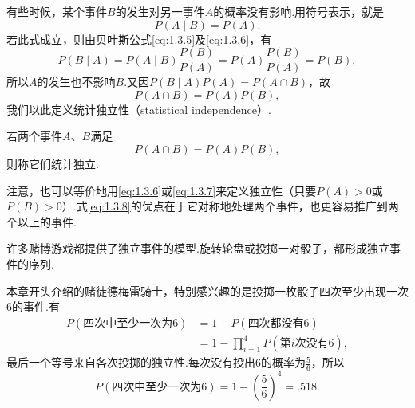 有些时候，某个事件$B$的发生对另一事件$A$的概率没有影响.用符号表示，就是
\begin{equation}\label{eq:1.3.6}P(A\mid B)=P(A).\end{equation}
若此式成立，则由贝叶斯公式\eqref{eq:1.3.5}及\eqref{eq:1.3.6}，有
\begin{equation}\label{eq:1.3.7}P(B\mid A)=P(A\mid B)\frac{P(B)}{P(A)}=P(A)\frac{P(B)}{P(A)}=P(B),\end{equation}
所以$A$的发生也不影响$B$.又因$P(B\mid A)P(A)=P(A\cap B)$，故
$$P(A\cap B)=P(A)P(B),$$
我们以此定义统计独立性（statistical independence）.


\begin{definition}\label{def:1.3.7}
若两个事件$A$、$B$满足
\begin{equation}\label{eq:1.3.8}P(A\cap B)=P(A)P(B),\end{equation}
则称它们统计独立.
\end{definition}
注意，也可以等价地用\eqref{eq:1.3.6}或\eqref{eq:1.3.7}来定义独立性（只要$P(A)>0$或\allowbreak\mbox{$P(B)>0$）.}\allowbreak 式\eqref{eq:1.3.8}的优点在于它对称地处理两个事件，也更容易推广到两个以上的事件.

许多赌博游戏都提供了独立事件的模型.旋转轮盘或投掷一对骰子，都形成独立事件的序列.
\begin{example}[德梅雷骑士]\label{ex:1.3.8}
本章开头介绍的赌徒德梅雷骑士，特别感兴趣的是投掷一枚骰子四次至少出现一次6的事件.有
\begin{equation*}\begin{aligned}
P(\text{四次中至少一次为6})&=1-P(\text{四次都没有6})\\
&=1-\prod_{i=1}^4 P(\text{第$i$次没有6}),
\end{aligned}\end{equation*}
最后一个等号来自各次投掷的独立性.每次没有投出6的概率为$\frac56$，所以
$$P(\text{四次中至少一次为6})=1-\left(\frac56\right)^4=.518.$$
\end{example}


